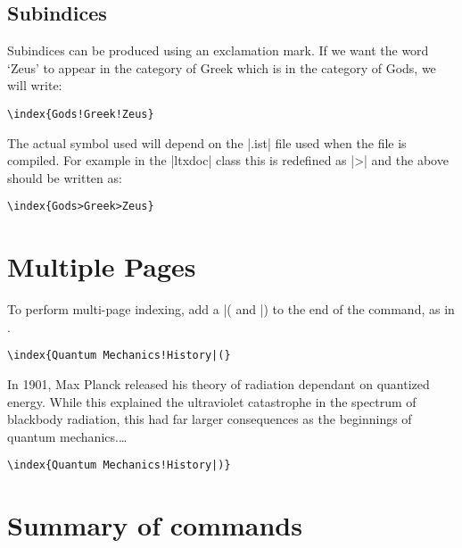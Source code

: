 \begin{multicols}{2}
\subsection{Subindices}
Subindices can be produced using an exclamation mark. If we want the word `Zeus'
to appear in the category of Greek which is in the category of Gods, we will write:

\verb+\index{Gods!Greek!Zeus}+

The actual symbol used will depend on the |.ist| file used when the file is compiled. For example in the |ltxdoc| class this is redefined as |>| and the above should be written as:

\verb+\index{Gods>Greek>Zeus}+


%


\section{Multiple Pages}

To perform multi-page indexing, add a |( and |) to the end of the \cmd{\index} command, as in 
.

{\small
\verb+\index{Quantum Mechanics!History|(}+

\narrower\narrower
In 1901, Max Planck released his theory of radiation dependant 
on quantized energy. While this explained the ultraviolet catastrophe
 in the spectrum of blackbody radiation, this had far larger consequences 
as the beginnings of quantum mechanics.\ldots

\verb+\index{Quantum Mechanics!History|)}+
}

\end{multicols}



\section{Summary of commands}

